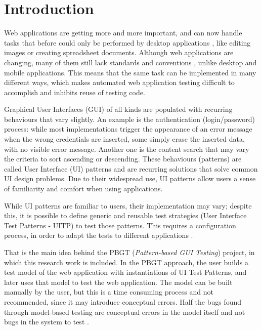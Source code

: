 \documentclass[10pt, conference, compsocconf]{IEEEtran}
\begin{document}
\IEEEpeerreviewmaketitle

\section{Introduction}\label{sec:intro}

Web applications are getting more and more important, and can now handle tasks that before could only be performed by desktop applications \cite{garrett2005ajax}, like editing images or creating spreadsheet documents. 
Although web applications are changing, many of them still lack standards and conventions \cite{constantine2002usage, fraternali2010rich}, unlike desktop and mobile applications.
This means that the same task can be implemented in many different ways, which makes automated web application testing difficult to accomplish and inhibits reuse of testing code. 


Graphical User Interfaces (GUI) of all kinds are populated with recurring behaviours that vary slightly. An example is the authentication (login/password) process: while most implementations trigger the appearance of an error message when the wrong credentials are inserted, some simply erase the inserted data, with no visible error message. Another one is the content search that may vary the criteria to sort ascending or descending. These behaviours (patterns) are called User Interface (UI) patterns \cite{van2001patterns} and are recurring solutions that solve common UI design problems. Due to their widespread use, UI patterns allow users a sense of familiarity and comfort when using applications. 

While UI patterns are familiar to users, their implementation may vary; despite this, it is possible to define generic and reusable test strategies (User Interface Test Patterns - UITP) to test those patterns. This requires a configuration process, in order to adapt the tests to different applications \cite{morgado2012gui}. 

That is the main idea behind the PBGT (\textit{Pattern-based GUI Testing}) project, in which this research work is included. In the PBGT approach, the user builds a test model of the web application with instantiations of UI Test Patterns, and later uses that model to test the web application. The model can be built manually by the user, but this is a time consuming process and not recommended, since it may introduce conceptual errors. Half the bugs found through model-based testing are conceptual errors in the model itself and not bugs in the system to test \cite{dalal1999model}.
\end{document}
